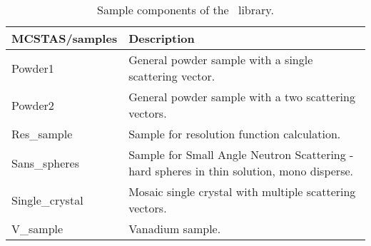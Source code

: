 \begin{table}
  \begin{center}
    {\let\my=\\
    \begin{tabular}{|p{}|p{}|}
      \hline
       {\bf MCSTAS/samples} & Description \\
       \hline
  Powder1      &  General powder sample with a single
                scattering vector. \\
  Powder2      &  General powder sample with a two
                scattering vectors. \\

  Res\_sample   & Sample for resolution function
                calculation. \\

  Sans\_spheres  & Sample for Small Angle Neutron Scattering - hard spheres in thin solution, mono disperse. \\

  Single\_crystal & Mosaic single crystal with multiple
                scattering vectors. \\

 V\_sample      & Vanadium sample.\\
      \hline
    \end{tabular}
    \caption{Sample components of the \MCS\ library.}
    \label{t:comp-samples}
    }
  \end{center}
\end{table}

